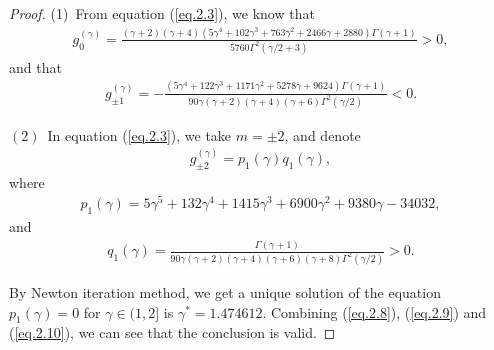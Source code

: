 \documentclass{siamart171218}
\numberwithin{theorem}{section}
\numberwithin{equation}{section}
\begin{document}
\begin{proof}
(1)~From equation (\ref{eq.2.3}), we know that
\begin{equation*}
\begin{aligned}\displaystyle
g_{0}^{(\gamma)}=
\frac{\left(\gamma+2\right)\left(\gamma+4\right)\left(5\gamma^4
+102\gamma^3+763\gamma^2
+2466\gamma+2880\right)
\Gamma\left(\gamma+1\right)}{5760\Gamma^2\left(\gamma/2+3\right)}>0,
\end{aligned}
\end{equation*}
and that
\begin{equation*}
\begin{aligned}\displaystyle
g_{\pm1}^{(\gamma)}=-
\frac{\left(5\gamma^4+122\gamma^3+1171\gamma^2
+5278\gamma+9624\right)
\Gamma\left(\gamma+1\right)}{90\gamma\left(\gamma+2\right)
\left(\gamma+4\right)\left(\gamma+6\right)
\Gamma^2\left(\gamma/2\right)}<0.
\end{aligned}
\end{equation*}

$\mathrm{(2)}$~In equation (\ref{eq.2.3}), we take $m=\pm2$, and denote
\begin{equation}\label{eq.2.8}
\begin{aligned}\displaystyle
g_{\pm2}^{(\gamma)}=p_1\left(\gamma\right)q_1\left(\gamma\right),
\end{aligned}
\end{equation}
where
\begin{equation}\label{eq.2.9}
\begin{aligned}\displaystyle
p_1\left(\gamma\right)=5\gamma^5+132\gamma^4+1415\gamma^3
+6900\gamma^2+9380\gamma-34032,
\end{aligned}
\end{equation}
and
\begin{equation}\label{eq.2.10}
\begin{aligned}\displaystyle
q_1\left(\gamma\right)=
\frac{\Gamma\left(\gamma+1\right)}{90\gamma\left(\gamma+2\right)
\left(\gamma+4\right)\left(\gamma+6\right)\left(\gamma+8\right)
\Gamma^2\left(\gamma/2\right)}>0.
\end{aligned}
\end{equation}

By Newton iteration method, we get a unique solution of the equation $p_1\left(\gamma\right)=0$
for $\gamma\in(1,2]$ is
$\gamma^{*}=1.474612$. Combining (\ref{eq.2.8}), (\ref{eq.2.9}) and (\ref{eq.2.10}),
 we can see that the conclusion is valid.


\end{proof}
\end{document}
